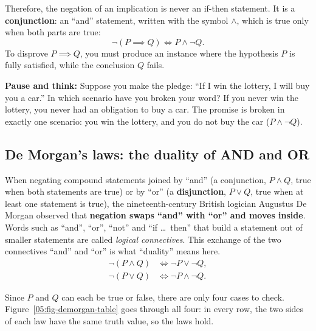 Therefore, the negation of an implication is never an if-then statement. It is a \textbf{conjunction}: an ``and'' statement, written with the symbol $\land$, which is true only when both parts are true:
\[
\neg(P \implies Q) \iff P \land \neg Q.
\]
To disprove $P \implies Q$, you must produce an instance where the hypothesis $P$ is fully satisfied, while the conclusion $Q$ fails.

\begin{recoverybox}
\textbf{Pause and think:} Suppose you make the pledge: ``If I win the lottery, I will buy you a car.'' In which scenario have you broken your word? If you never win the lottery, you never had an obligation to buy a car. The promise is broken in exactly one scenario: you win the lottery, and you do not buy the car ($P \land \neg Q$).
\end{recoverybox}

\subsection{De Morgan's laws: the duality of AND and OR}

When negating compound statements joined by ``and'' (a conjunction, $P \land Q$, true when both statements are true) or by ``or'' (a \textbf{disjunction}, $P \lor Q$, true when at least one statement is true), the nineteenth-century British logician Augustus De Morgan observed that \textbf{negation swaps ``and'' with ``or'' and moves inside}. Words such as ``and'', ``or'', ``not'' and ``if \ldots\ then'' that build a statement out of smaller statements are called \emph{logical connectives}. This exchange of the two connectives ``and'' and ``or'' is what ``duality'' means here.
\begin{align*}
\neg(P \land Q) &\iff \neg P \lor \neg Q, \\
\neg(P \lor Q) &\iff \neg P \land \neg Q.
\end{align*}

Since $P$ and $Q$ can each be true or false, there are only four cases to check. Figure~\ref{05:fig-demorgan-table} goes through all four: in every row, the two sides of each law have the same truth value, so the laws hold.

